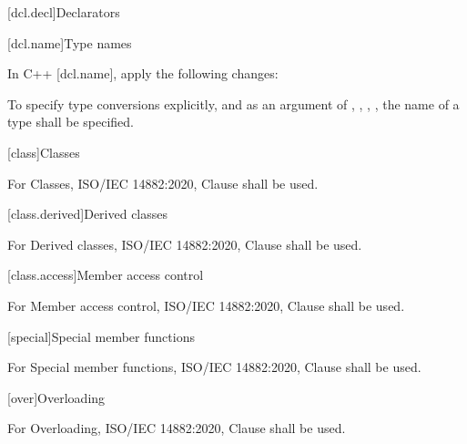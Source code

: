 
[dcl.decl]{Declarators}

[dcl.name]{Type names}

\pnum
In C++ [dcl.name], apply the following changes:

\begin{std.txt}
To specify type conversions explicitly, and as an argument of ,
, ,  ,  the name of a type shall be specified.
\end{std.txt}

[class]{Classes}

For Classes, ISO/IEC 14882:2020, Clause \the\value{chapter} shall be used.

[class.derived]{Derived classes}

For Derived classes, ISO/IEC 14882:2020, Clause \the\value{chapter} shall be used.

[class.access]{Member access control}

For Member access control, ISO/IEC 14882:2020, Clause \the\value{chapter} shall be used.

[special]{Special member functions}

For Special member functions, ISO/IEC 14882:2020, Clause \the\value{chapter} shall be used.

[over]{Overloading}

For Overloading, ISO/IEC 14882:2020, Clause \the\value{chapter} shall be used.
